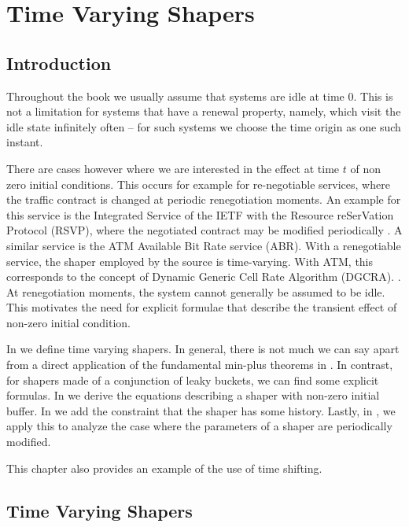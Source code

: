 \chapter{Time Varying Shapers}

\section{Introduction}
Throughout the book we usually assume that systems are idle at
time $0$. This is not a limitation for systems that have a renewal
property, namely, which visit the idle state infinitely often --
for such systems we choose the time origin as one such instant.

There are cases however where we are interested in the effect at
time $t$ of non zero initial conditions. This occurs for example
for re-negotiable services, where the traffic contract is changed
at periodic renegotiation moments.  An example for this service is
the Integrated Service of the IETF with the Resource reSerVation
Protocol (RSVP), where the negotiated contract may be modified
periodically  \cite{GP98}. A similar service is the
ATM Available Bit Rate service (ABR).%
  
With a renegotiable service, the shaper employed by the
source is time-varying. With ATM, this corresponds to the concept
of Dynamic
Generic Cell Rate Algorithm (DGCRA).%
. At renegotiation moments, the system cannot
generally be assumed to be idle. This motivates the need for
explicit formulae that describe the transient effect of non-zero
initial condition.

In  we define time varying shapers. In general,
there is not much we can say apart from a direct application of
the fundamental min-plus theorems in
. In contrast, for shapers made of a
conjunction of leaky buckets, we can find some explicit formulas.
In  we derive the equations describing a shaper
with non-zero initial buffer. In  we add the
constraint that the shaper has some history. Lastly, in
, we apply this to analyze the case where the
parameters of a shaper are periodically modified.

This chapter also provides an example of the use of time shifting.

\section{Time Varying Shapers}

